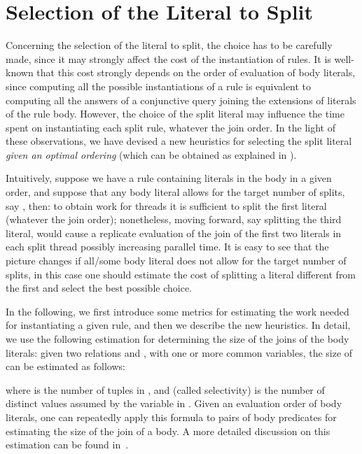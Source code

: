 \documentclass[preprint]{tlp}
\begin{document}
\section{Selection of the Literal to Split}\label{sec:splitlit}

Concerning the selection of the literal to split, the choice has to
be carefully made, since it may strongly affect the cost of the
instantiation of rules. It is well-known that this cost strongly depends on
the order of evaluation of body literals, since computing all the possible
instantiations of a rule is equivalent to computing all the answers
of a conjunctive query joining the extensions of literals of the
rule body. However, the choice of the split literal may
influence the time spent on instantiating each split rule, whatever the join order.
In the light of these observations, we have devised a new heuristics for selecting
the split literal {\em given an optimal ordering} (which can be obtained as explained in \cite{leon-etal-2001a}).

Intuitively, suppose we have a rule  containing  literals in
the body in a given order, and suppose that any body literal allows
for the target number of splits, say , then: to obtain work for
 threads it is sufficient to split the first literal (whatever
the join order); nonetheless, moving forward, say splitting the
third literal, would cause a replicate evaluation of the join of the
first two literals in each split thread possibly increasing parallel
time. It is easy to see that the picture changes if  all/some body
literal does not allow for the target number of splits, in this case
one should estimate the cost of splitting a literal different from
the first and select the best possible choice.

In the following, we first introduce some metrics for estimating the
work needed for instantiating a given rule, and then we describe the
new heuristics.
In detail, we use the following estimation for determining
the size of the joins of the body literals: given two relations  and ,
with one or more common variables, the size of  can be estimated
as follows:



\noindent where  is the number of tuples in ,
and  (called selectivity) is the number of distinct values
assumed by the variable  in . Given an evaluation order of body literals,
one can repeatedly apply this formula to pairs of body predicates
for estimating the size of the join of a body.
A more detailed discussion on this estimation can be found in~\cite{ullm-89}.
\end{document}
